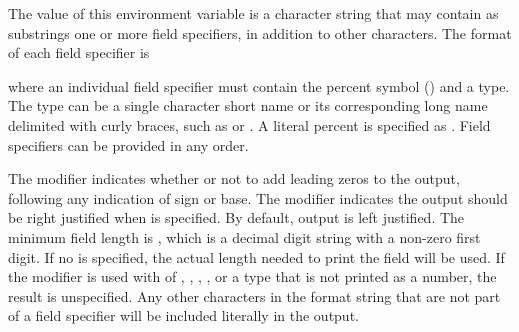 The value of this environment variable is a character string that may contain as
substrings one or more field specifiers, in addition to other characters.
The format of each field specifier is

\begin{ompSyntax}
\end{ompSyntax}

where an individual field specifier must contain the percent symbol
({\pcode{\%}}) and a type. The type can be a single character short
name or its corresponding long name delimited with curly braces,
 such as {} or {}. A literal percent
is specified as {\pcode{\%\%}}.  Field specifiers can be provided in any order.

The  modifier indicates whether or not to add leading zeros to the
output, following any indication of sign or base. The  modifier
indicates the output should be right justified when  is specified.
By default, output is left justified. The minimum field length is ,
which is a decimal digit string with a non-zero first digit. If no 
is specified, the actual length needed to print the field will be used.
If the  modifier is used with  of ,
{}, , {}, or a type that
is not printed as a number, the result is unspecified. Any other characters
in the format string that are not part of a field specifier will be included
literally in the output.

